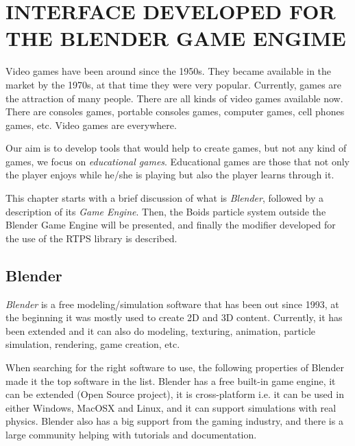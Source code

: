 \chapter{INTERFACE DEVELOPED FOR THE BLENDER GAME ENGIME}\label{chap5}


Video games have been around since the 1950s\cite{historyVideoGames}. They became available in the market by the 1970s, at that time they were very popular. Currently, games are the attraction of many people. There are all kinds of video games available now. There are consoles games, portable consoles games, computer games, cell phones games, etc. Video games are everywhere. 

Our aim is to develop tools that would help to create games, but not any kind of games, we focus on \textit{educational games}. Educational games are those that not only the player enjoys while he/she is playing but also the player learns through it. 


This chapter starts with a brief discussion of what is \textit{Blender}, followed by a description of its \textit{Game Engine}. Then, the Boids particle system outside the Blender Game Engine will be presented, and finally the modifier developed for the use of the RTPS library is described.

\section{Blender}\label{blenderSec}
\textit{Blender}\cite{blenderWeb} is a free modeling/simulation software that has been out since 1993, at the beginning it was mostly used to create 2D and 3D content. Currently, it has been extended and it can also do modeling, texturing, animation, particle simulation, rendering, game creation, etc.

When searching for the right software to use, the following properties of Blender made it the top software in the list. Blender has a free built-in game engine, it can be extended (Open Source project), it is cross-platform i.e. it can be used in either Windows, MacOSX and Linux, and it can support simulations with real physics. Blender also has a big support from the gaming industry, and there is a large community helping with tutorials and documentation.

